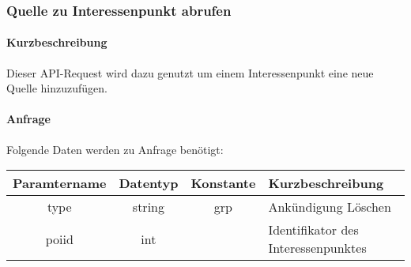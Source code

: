 \subsubsection{Quelle zu Interessenpunkt abrufen}
\paragraph{Kurzbeschreibung}Dieser API-Request wird dazu genutzt um einem Interessenpunkt eine neue Quelle hinzuzufügen.
\paragraph{Anfrage}Folgende Daten werden zu Anfrage benötigt:
\begin{table}[H]
	\begin{tabular}{|c|c|c|p{6.5cm}|}
		\hline
		\textbf{Paramtername} & \textbf{Datentyp} & \textbf{Konstante} & \textbf{Kurzbeschreibung}                                                                                               \\ \hline
		type                & string            & grp                & Ankündigung Löschen \\ \hline
		poiid               & int               &                    & Identifikator des Interessenpunktes \\ \hline
	\end{tabular}
\end{table}
